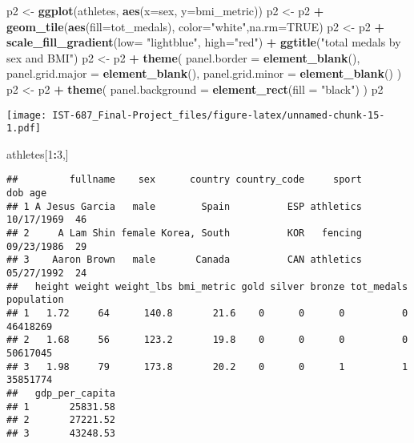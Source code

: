 \documentclass[]{article}
\newenvironment{Shaded}{\begin{snugshade}}{\end{snugshade}}
\newcommand{\DataTypeTok}[1]{\textcolor[rgb]{0.13,0.29,0.53}{#1}}
\newcommand{\DecValTok}[1]{\textcolor[rgb]{0.00,0.00,0.81}{#1}}
\newcommand{\KeywordTok}[1]{\textcolor[rgb]{0.13,0.29,0.53}{\textbf{#1}}}
\newcommand{\NormalTok}[1]{#1}
\newcommand{\OperatorTok}[1]{\textcolor[rgb]{0.81,0.36,0.00}{\textbf{#1}}}
\newcommand{\OtherTok}[1]{\textcolor[rgb]{0.56,0.35,0.01}{#1}}
\newcommand{\StringTok}[1]{\textcolor[rgb]{0.31,0.60,0.02}{#1}}
\begin{document}
\begin{Shaded}
\begin{Highlighting}[]
\NormalTok{p2 <-}\StringTok{ }\KeywordTok{ggplot}\NormalTok{(athletes, }\KeywordTok{aes}\NormalTok{(}\DataTypeTok{x=}\NormalTok{sex, }\DataTypeTok{y=}\NormalTok{bmi_metric))}
\NormalTok{p2 <-}\StringTok{ }\NormalTok{p2 }\OperatorTok{+}\StringTok{ }\KeywordTok{geom_tile}\NormalTok{(}\KeywordTok{aes}\NormalTok{(}\DataTypeTok{fill=}\NormalTok{tot_medals), }\DataTypeTok{color=}\StringTok{"white"}\NormalTok{,}\DataTypeTok{na.rm=}\OtherTok{TRUE}\NormalTok{) }
\NormalTok{p2 <-}\StringTok{ }\NormalTok{p2 }\OperatorTok{+}\StringTok{ }\KeywordTok{scale_fill_gradient}\NormalTok{(}\DataTypeTok{low=} \StringTok{"lightblue"}\NormalTok{, }\DataTypeTok{high=}\StringTok{"red"}\NormalTok{) }\OperatorTok{+}\StringTok{ }\KeywordTok{ggtitle}\NormalTok{(}\StringTok{"total medals by sex and BMI"}\NormalTok{)}
\NormalTok{p2 <-}\StringTok{ }\NormalTok{p2 }\OperatorTok{+}\StringTok{ }\KeywordTok{theme}\NormalTok{(}
  \DataTypeTok{panel.border =} \KeywordTok{element_blank}\NormalTok{(),}
  \DataTypeTok{panel.grid.major =} \KeywordTok{element_blank}\NormalTok{(),}
  \DataTypeTok{panel.grid.minor =} \KeywordTok{element_blank}\NormalTok{()}
\NormalTok{)}
\NormalTok{p2 <-}\StringTok{ }\NormalTok{p2 }\OperatorTok{+}\StringTok{ }\KeywordTok{theme}\NormalTok{(}
  \DataTypeTok{panel.background =} \KeywordTok{element_rect}\NormalTok{(}\DataTypeTok{fill =} \StringTok{"black"}\NormalTok{)}
\NormalTok{) }
\NormalTok{p2 }
\end{Highlighting}
\end{Shaded}

\texttt{[image: IST-687\_Final-Project\_files/figure-latex/unnamed-chunk-15-1.pdf]}

\begin{Shaded}
\begin{Highlighting}[]
\NormalTok{athletes[}\DecValTok{1}\OperatorTok{:}\DecValTok{3}\NormalTok{,]}
\end{Highlighting}
\end{Shaded}

\begin{verbatim}
##         fullname    sex      country country_code     sport        dob age
## 1 A Jesus Garcia   male        Spain          ESP athletics 10/17/1969  46
## 2     A Lam Shin female Korea, South          KOR   fencing 09/23/1986  29
## 3    Aaron Brown   male       Canada          CAN athletics 05/27/1992  24
##   height weight weight_lbs bmi_metric gold silver bronze tot_medals population
## 1   1.72     64      140.8       21.6    0      0      0          0   46418269
## 2   1.68     56      123.2       19.8    0      0      0          0   50617045
## 3   1.98     79      173.8       20.2    0      0      1          1   35851774
##   gdp_per_capita
## 1       25831.58
## 2       27221.52
## 3       43248.53
\end{verbatim}
\end{document}
